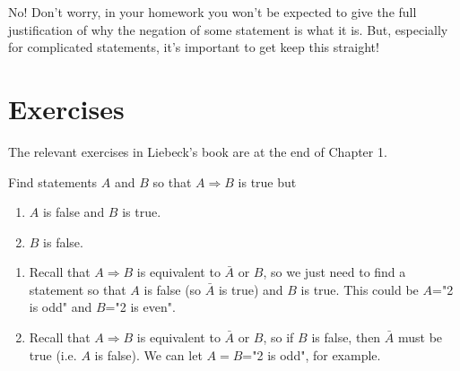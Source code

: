 \documentclass[11pt,dvipsnames]{book}
\numberwithin{figure}{section} %
\numberwithin{table}{section} %
\begin{document}
 No! Don't worry, in your homework you won't be expected to give the full justification of why the negation of some statement is what it is. But, especially for complicated statements, it's important to get keep this straight!


\section{Exercises}

The relevant exercises in Liebeck's book are at the end of Chapter 1.


\begin{exercise}
Find statements $A$ and $B$ so that $A\Rightarrow B$ is true but
\begin{enumerate}[label=(\alph*)]
\item $A$ is false and $B$ is true.
\item $B$ is false.
\end{enumerate}
\begin{solution}
\begin{enumerate}[label=(\alph*)]
\item
Recall that $A\Rightarrow B$ is equivalent to $\bar{A}$ or $B$, so we just need to find a statement so that $A$ is false (so $\bar{A}$ is true) and $B$ is true. This could be $A$="2 is odd" and $B$="2 is even".
\item Recall that $A\Rightarrow B$ is equivalent to $\bar{A}$ or $B$, so if $B$ is false, then $\bar{A}$ must be true (i.e. $A$ is false). We  can  let $A=B$="2 is odd", for example.
\end{enumerate}
\end{solution}
\end{exercise}
\end{document}
